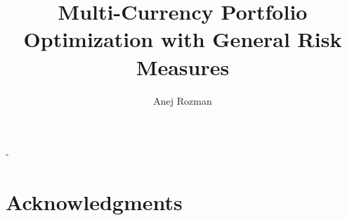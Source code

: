 \documentclass[11pt,a4paper,oneside]{memoir}
\title{Multi-Currency Portfolio Optimization with General Risk
Measures}
\author{Anej Rozman}
\date{}
\begin{document}
\frontmatter  

\begin{titlingpage} 
  \calccentering{\unitlength}
  \begin{adjustwidth*}{\unitlength-24pt}{-\unitlength-24pt}  
    \maketitle
  \end{adjustwidth*}
\end{titlingpage}

\chapter*{Acknowledgments}

\pagebreak

  

\cleartorecto 
\tableofcontents
\mainmatter

\newpage



 
  




\backmatter




\appendix
\appendixpage




\end{document}
